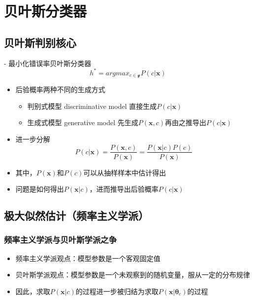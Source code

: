 \chapter{贝叶斯分类器}


\section{贝叶斯判别核心}

- 最小化错误率贝叶斯分类器
\begin{equation}
h^\ast=argmax_{c\in \mathcal{y}}P(c|\mathbf{x})
\end{equation}

\begin{itemize}
\item 后验概率两种不同的生成方式
    \begin{itemize}
    \item 判别式模型 discriminative model 直接生成$P(c|\mathbf{x})$
    \item 生成式模型 generative model 先生成$P(\mathbf{x}, c)$再由之推导出$P(c|\mathbf{x})$
    \end{itemize}
\item 进一步分解
    \begin{equation}
    P(c|\mathbf{x})=\frac{P(\mathbf{x}, c)}{P(\mathbf{x})}=\frac{P(\mathbf{x}|c)P(c)}{P(\mathbf{x})}
    \end{equation}
    \item 其中，$P(\mathbf{x})$和$P(c)$可以从抽样样本中估计得出
    \item 问题是如何得出$P(\mathbf{x}|c)$，进而推导出后验概率$P(c|\mathbf{x})$
\end{itemize}

\section{极大似然估计（频率主义学派）}

\subsection{频率主义学派与贝叶斯学派之争}

\begin{itemize}
\item 频率主义学派观点：模型参数是一个客观固定值
\item 贝叶斯学派观点：模型参数是一个未观察到的随机变量，服从一定的分布规律
\item 因此，求取$P(\mathbf{x}|c)$的过程进一步被归结为求取$P(\mathbf{x}|\mathbf{\theta}_c)$的过程
\end{itemize}

